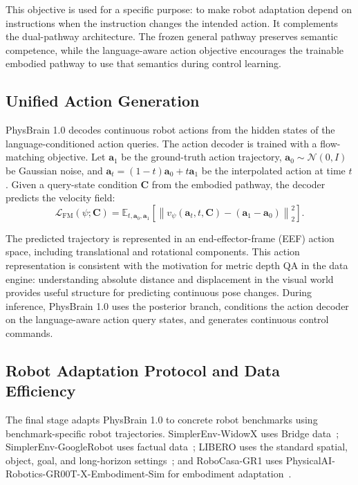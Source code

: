 This objective is used for a specific purpose: to make robot adaptation depend on instructions when the instruction changes the intended action. It complements the dual-pathway architecture. The frozen general pathway preserves semantic competence, while the language-aware action objective encourages the trainable embodied pathway to use that semantics during control learning.

\subsection{Unified Action Generation}

PhysBrain 1.0 decodes continuous robot actions from the hidden states of the language-conditioned action queries. The action decoder is trained with a flow-matching objective. Let $\mathbf{a}_1$ be the ground-truth action trajectory, $\mathbf{a}_0 \sim \mathcal{N}(0, I)$ be Gaussian noise, and $\mathbf{a}_t = (1-t)\mathbf{a}_0 + t\mathbf{a}_1$ be the interpolated action at time $t$. Given a query-state condition $\mathbf{C}$ from the embodied pathway, the decoder predicts the velocity field:
\begin{equation}
    \mathcal{L}_{\mathrm{FM}}(\psi; \mathbf{C}) =
    \mathbb{E}_{t,\mathbf{a}_0,\mathbf{a}_1}
    \left[
    \left\| v_\psi(\mathbf{a}_t, t, \mathbf{C}) - (\mathbf{a}_1 - \mathbf{a}_0) \right\|_2^2
    \right].
\end{equation}

The predicted trajectory is represented in an end-effector-frame (EEF) action space, including translational and rotational components. This action representation is consistent with the motivation for metric depth QA in the data engine: understanding absolute distance and displacement in the visual world provides useful structure for predicting continuous pose changes. During inference, PhysBrain 1.0 uses the posterior branch, conditions the action decoder on the language-aware action query states, and generates continuous control commands.

\subsection{Robot Adaptation Protocol and Data Efficiency}

The final stage adapts PhysBrain 1.0 to concrete robot benchmarks using benchmark-specific robot trajectories. SimplerEnv-WidowX uses Bridge data~\cite{Bridgedatav2_2023_CoRL}; SimplerEnv-GoogleRobot uses factual data~\cite{SimplerEnv_2024_CoRL}; LIBERO uses the standard spatial, object, goal, and long-horizon settings~\cite{OpenVLA_2024_CoRL}; and RoboCasa-GR1 uses PhysicalAI-Robotics-GR00T-X-Embodiment-Sim for embodiment adaptation~\cite{RoboCasa_2024_RSS,GR00T_2025_arXiv}.

